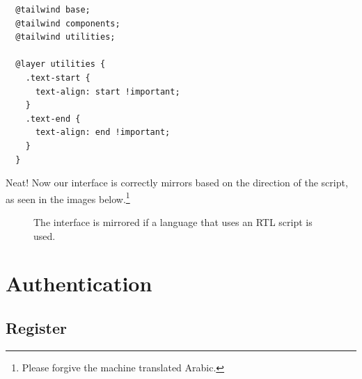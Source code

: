 \documentclass{report}
\begin{document}
\begin{verbatim}
  @tailwind base;
  @tailwind components;
  @tailwind utilities;
  
  @layer utilities {
    .text-start {
      text-align: start !important;
    }
    .text-end {
      text-align: end !important;
    }
  }  
\end{verbatim}
Neat! Now our interface is correctly mirrors based on the direction of the script, as seen in the images below.\footnote{Please forgive the machine translated Arabic.}
\begin{figure}[H]
  \centering
  \label{fig:localisation2}
  \caption{The interface is mirrored if a language that uses an RTL script is used.}
\end{figure}

\section{Authentication}

\subsection{Register}
\end{document}
